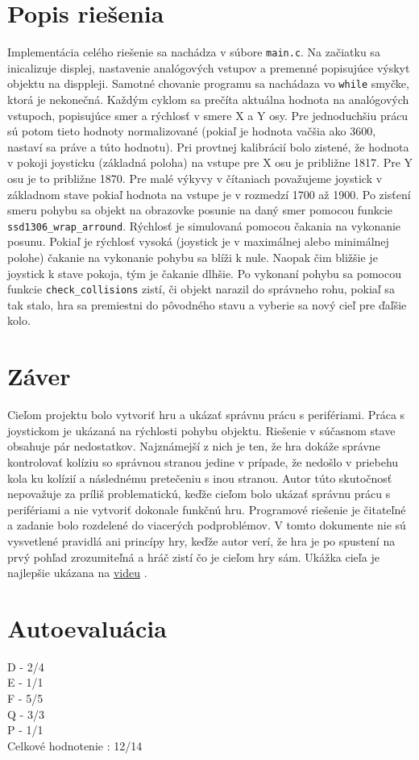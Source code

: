 \documentclass{article}
\begin{document}
\section{Popis riešenia}
Implementácia celého riešenie sa nachádza v súbore \verb|main.c|. Na začiatku sa inicalizuje displej, nastavenie analógových vstupov a premenné popisujúce výskyt objektu na disppleji. Samotné chovanie programu sa nachádaza vo \verb|while| smyčke, ktorá je nekonečná. Každým cyklom sa prečíta aktuálna hodnota na analógových vstupoch, popisujúce smer a rýchlosť v smere X a Y osy. Pre jednoduchšiu prácu sú potom tieto hodnoty normalizované (pokiaľ je hodnota vačšia ako 3600, nastaví sa práve a túto hodnotu). Pri provtnej kalibrácií bolo zistené, že hodnota v pokoji joysticku (základná poloha) na vstupe pre X osu je približne 1817. Pre Y osu je to približne 1870. Pre malé výkyvy v čítaniach považujeme joystick v základnom stave pokiaľ hodnota na vstupe je v rozmedzí 1700 až 1900. Po zisťení smeru pohybu sa objekt na obrazovke posunie na daný smer pomocou funkcie \verb|ssd1306_wrap_arround|.
Rýchlosť je simulovaná pomocou čakania na vykonanie posunu. Pokiaľ je rýchlosť vysoká (joystick je v maximálnej alebo minimálnej polohe) čakanie na vykonanie pohybu sa blíži k nule. Naopak čim bližšie je joystick k stave pokoja, tým je čakanie dlhšie. Po vykonaní pohybu sa pomocou funkcie \verb|check_collisions| zistí, či objekt narazil do správneho rohu, pokiaľ sa tak stalo, hra sa premiestni do pôvodného stavu a vyberie sa nový cieľ pre ďaľšie kolo. 

\section{Záver}
Cieľom projektu bolo vytvoriť hru a ukázať správnu prácu s perifériami. Práca s joystickom je ukázaná na rýchlosti pohybu objektu. Riešenie v súčasnom stave obsahuje pár nedostatkov. Najznámejší z nich je ten, že hra dokáže správne kontrolovať kolíziu so správnou stranou jedine v prípade, že nedošlo v priebehu kola ku kolízií a následnému pretečeniu s inou stranou. Autor túto skutočnosť nepovažuje za príliš problematickú, keďže cieľom bolo ukázať správnu prácu s perifériami a nie vytvoriť dokonale funkčnú hru. Programové riešenie je čitateľné a zadanie bolo rozdelené do viacerých podproblémov.
V tomto dokumente nie sú vysvetlené pravidlá ani princípy hry,  keďže autor verí, že hra je po spustení na prvý pohľad zrozumiteľná a hráč zistí čo je cieľom hry sám. Ukážka cieľa je najlepšie ukázana na \href{https://drive.google.com/file/d/1UcCmRvFZmSy3YNQ0_3ex0Vm7ZOvGVgdJ/view?usp=sharing}{videu} .

\section{Autoevaluácia}
D - 2/4 \\
E - 1/1 \\
F - 5/5 \\ 
Q - 3/3 \\
P - 1/1 \\
Celkové hodnotenie : 12/14
\end{document}
